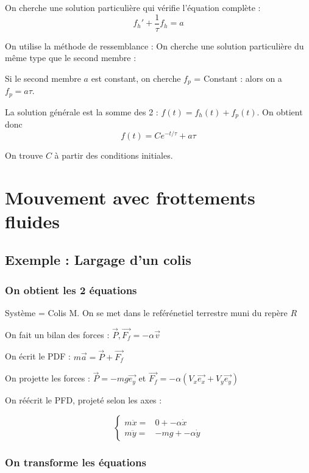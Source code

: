 \documentclass[french]{yLectureNote}
\renewcommand{\vec}{\overrightarrow}
\begin{document}
On cherche une solution particulière qui vérifie l'équation complète :
\[ f_h'+\frac{1}{\tau}f_h = a \]

On utilise la méthode de ressemblance : On cherche une solution particulière du m\^eme type que le second membre :

Si le second membre $a$ est constant, on cherche $f_p$ = Constant : alors on a $f_p = a\tau$.

La solution générale est la somme des 2 : $f(t) = f_h(t)+f_p(t)$. On obtient donc \[ f(t) = Ce^{-t/\tau}+a\tau\]

On trouve $C$ à partir des conditions initiales.
\section{Mouvement avec frottements fluides}
\subsection{Exemple : Largage d'un colis}
\subsubsection{On obtient les 2 équations}
Système  = Colis M. On se met dans le reférénetiel terrestre muni du repère $R$

On fait un bilan des forces : $\vec{P}, \vec{F_f} = -\alpha\vec{v}$

On écrit le PDF : $m\vec{a} = \vec{P}+ \vec{F_f}$

On projette les forces : $\vec{P} = -mg\vec{e_y}$ et $\vec{F_f} = -\alpha(V_x\vec{e_x}+V_y\vec{e_y})$

On réécrit le PFD, projeté selon les axes :

\[
 \left\{\begin{matrix}
 m\ddot{x} =& 0 + -\alpha\dot{x}\\
 m\ddot{y} =& -mg + -\alpha\dot{y}
\end{matrix}\right.
\]
\subsubsection{On transforme les équations}
\end{document}
